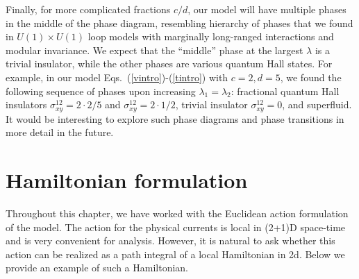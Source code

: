Finally, for more complicated fractions $c/d$, our model will have multiple phases in the middle of the phase diagram, resembling hierarchy of phases that we found in $U(1) \times U(1)$ loop models with marginally long-ranged interactions and modular invariance.\cite{Gen2Loops}  We expect that the ``middle'' phase at the largest $\lambda$ is a trivial insulator, while the other phases are various quantum Hall states.  For example, in our model Eqs.~(\ref{vintro})-(\ref{tintro}) with $c=2, d=5$, we found the following sequence of phases upon increasing $\lambda_1 = \lambda_2$: fractional quantum Hall insulators $\sigma^{12}_{xy} = 2\cdot 2/5$ and $\sigma^{12}_{xy} = 2\cdot 1/2$, trivial insulator $\sigma^{12}_{xy} = 0$, and superfluid.  It would be interesting to explore such phase diagrams and phase transitions in more detail in the future.



\section{Hamiltonian formulation}
\label{section::H}
Throughout this chapter, we have worked with the Euclidean action formulation of the model.  The action for the physical currents is local in (2+1)D space-time and is very convenient for analysis.  However, it is natural to ask whether this action can be realized as a path integral of a local Hamiltonian in 2d.\cite{Matthew_Alexei_thanks}  Below we provide an example of such a Hamiltonian.

